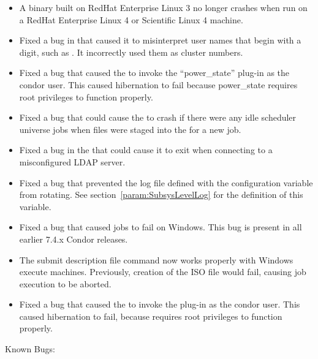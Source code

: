 \begin{itemize}
\item A  binary built on RedHat Enterprise Linux 3
no longer crashes
when run on a RedHat Enterprise Linux 4 or Scientific Linux 4 machine.

\item Fixed a bug in  that caused it to misinterpret user names
that begin with a digit, such as .
It incorrectly used them as cluster numbers. 

\item Fixed a bug that caused the  to invoke the
  ``power\_state'' plug-in as the condor user.  This caused
  hibernation to fail because power\_state requires root privileges
  to function properly.

\item Fixed a bug that could cause the  to crash if there
were any idle scheduler universe jobs when files were staged into the
 for a new job.

\item Fixed a bug in the  that could cause it to exit
when connecting to a misconfigured LDAP server.

\item Fixed a bug that prevented the log file defined with the configuration
variable  from rotating.
See section~\ref{param:SubsysLevelLog} for the definition of this variable. 

\item Fixed a bug that caused  jobs to fail on Windows. 
This bug is present in all earlier 7.4.x Condor releases.

\item The submit description file command 
now works properly with Windows execute machines. 
Previously, creation of the ISO file would fail, 
causing job execution to be aborted.

\item Fixed a bug that caused the  to invoke the
   plug-in as the condor user.
  This caused hibernation to fail, 
  because  requires root privileges to function properly.

\end{itemize}

\noindent Known Bugs:

